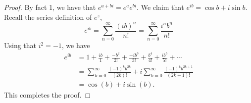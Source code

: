 \documentclass[letter]{article}
\begin{document}
	\begin{proof}
		By fact 1, we have that $e^{a + bi} = e^ae^{bi}.$ We claim that $e^{ib} = \cos b + i\sin b$. Recall the series definition of
		$e^z$,
		\begin{equation*}
			e^{ib} = \sum_{n=0}^\infty \frac{(ib)^n}{n!} = \sum_{n=0}^\infty \frac{i^n b^n}{n!}
		\end{equation*}
		Using that $i^2 = -1$, we have
		\begin{equation*}
			\begin{aligned}
			e^{ib} &= 1 + \frac{ib}{1} + \frac{-b^2}{2!} + \frac{-ib^3}{3!} + \frac{b^4}{4!} + \frac{ib^5}{5!} + \cdots \\
				   &= \sum_{k=0}^\infty \frac{(-1)^kb^{2k}}{(2k)!} + i \sum_{k=0}^\infty \frac{(-1)^k b^{2k+1}}{(2k+1)!} \\
				   &= \cos(b) + i\sin(b).
			\end{aligned}
		\end{equation*}
		This completes the proof.
	\end{proof}
\end{document}
